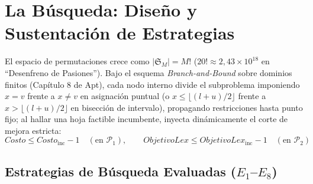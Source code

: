 \section{La Búsqueda: Diseño y Sustentación de Estrategias}
\label{sec:busqueda}

El espacio de permutaciones crece como $|\mathfrak{S}_M| = M!$ ($20! \approx 2{,}43 \times 10^{18}$ en ``Desenfreno de Pasiones''). Bajo el esquema \emph{Branch-and-Bound} sobre dominios finitos (Capítulo 8 de Apt), cada nodo interno divide el subproblema imponiendo $x = v$ frente a $x \neq v$ en asignación puntual (o $x \le \lfloor(l+u)/2\rfloor$ frente a $x > \lfloor(l+u)/2\rfloor$ en bisección de intervalo), propagando restricciones hasta punto fijo; al hallar una hoja factible incumbente, inyecta dinámicamente el corte de mejora estricta:
\begin{equation}
    Costo \le Costo_{\text{inc}} - 1 \quad (\text{en } \mathcal{P}_1), \qquad
    ObjetivoLex \le ObjetivoLex_{\text{inc}} - 1 \quad (\text{en } \mathcal{P}_2)
    \label{eq:bnb_cut_telenovela}
\end{equation}

\subsection{Estrategias de Búsqueda Evaluadas (\texorpdfstring{$E_1$--$E_8$}{E1-E8})}

